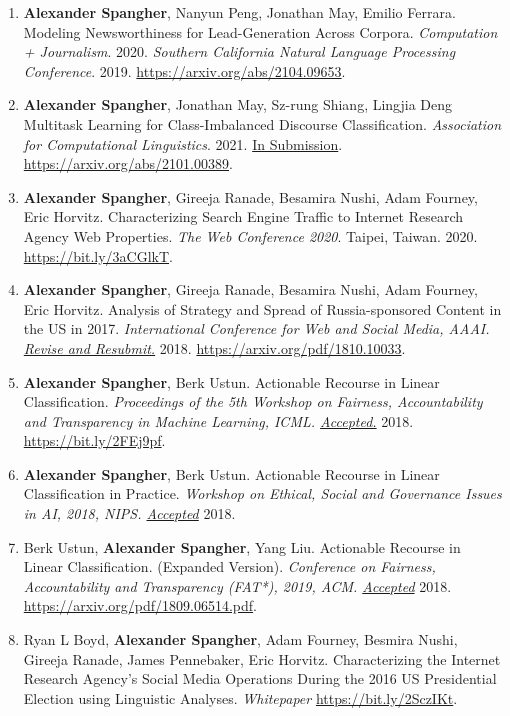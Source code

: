\documentclass[margin]{res}
\begin{document}
\begin{resume}
\begin{enumerate}
	\item \textbf{Alexander Spangher}, Nanyun Peng, Jonathan May, Emilio Ferrara. Modeling Newsworthiness for Lead-Generation Across Corpora. \textit{Computation + Journalism}. 2020. \textit{Southern California Natural Language Processing Conference}. 2019. \url{https://arxiv.org/abs/2104.09653}.
	
	\item \textbf{Alexander Spangher}, Jonathan May, Sz-rung Shiang, Lingjia Deng Multitask Learning for Class-Imbalanced Discourse Classification. \textit{Association for Computational Linguistics}. 2021. \underline{In Submission}. \url{https://arxiv.org/abs/2101.00389}.
	
	\item \textbf{Alexander Spangher}, Gireeja Ranade, Besamira Nushi, Adam Fourney, Eric Horvitz. Characterizing Search Engine Traffic to Internet Research Agency Web Properties. \textit{The Web Conference 2020}. Taipei, Taiwan. 2020. \url{https://bit.ly/3aCGlkT}.
	\item \textbf{Alexander Spangher}, Gireeja Ranade, Besamira Nushi, Adam Fourney, Eric Horvitz. Analysis of Strategy and Spread of Russia-sponsored Content in the US in 2017. \textit{International Conference for Web and Social Media, AAAI. \underline{Revise and Resubmit.}} 2018. \url{https://arxiv.org/pdf/1810.10033}.
	\item \textbf{Alexander Spangher}, Berk Ustun. Actionable Recourse in Linear Classification. \textit{Proceedings of the 5th Workshop on Fairness, Accountability and Transparency in Machine Learning, ICML. \underline{Accepted.}} 2018. \url{https://bit.ly/2FEj9pf}.
	\item \textbf{Alexander Spangher}, Berk Ustun. Actionable Recourse in Linear Classification in Practice. \textit{Workshop on Ethical, Social and Governance Issues in AI, 2018, NIPS. \underline{Accepted}} 2018. 
	\item Berk Ustun, \textbf{Alexander Spangher}, Yang Liu. Actionable Recourse in Linear Classification. (Expanded Version). \textit{Conference on Fairness, Accountability and Transparency (FAT*), 2019, ACM. \underline{Accepted}} 2018. \url{https://arxiv.org/pdf/1809.06514.pdf}.
	\item Ryan L Boyd, \textbf{Alexander Spangher}, Adam Fourney, Besmira Nushi, Gireeja Ranade, James Pennebaker, Eric Horvitz. Characterizing the Internet Research Agency’s Social Media Operations During the 2016 US Presidential Election using Linguistic Analyses. \textit{Whitepaper} \url{https://bit.ly/2SczIKt}.
\end{enumerate}


\end{resume}
\end{document}
